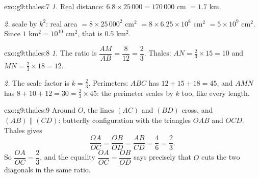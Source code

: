 \begin{solution}{exo:g9:thales:7}
\emph{1.} Real distance: $6.8 \times 25\,000 = 170\,000$ cm $=
1.7$ km.

\emph{2.}  scale by $k^2$: real area $= 8 \times 25\,000^2$
cm$^2$ $= 8 \times 6.25 \times 10^8$ cm$^2$ $= 5 \times 10^9$ cm$^2$.
Since $1$ km$^2 = 10^{10}$ cm$^2$, that is $0.5$ km$^2$.
\end{solution}

\begin{solution}{exo:g9:thales:8}
\emph{1.} The ratio is $\dfrac{AM}{AB} = \dfrac{8}{12} = \dfrac23$.
Thales: $AN = \frac23 \times 15 = 10$ and $MN = \frac23 \times 18 = 12$.

\emph{2.} The scale factor is $k = \frac23$. Perimeters: $ABC$ has
$12 + 15 + 18 = 45$, and $AMN$ has $8 + 10 + 12 = 30 = \frac23 \times
45$: the perimeter scales by $k$ too, like every length.
\end{solution}

\begin{solution}{exo:g9:thales:9}
Around $O$, the lines $(AC)$ and $(BD)$ cross, and
$(AB) \parallel (CD)$: butterfly configuration with the triangles $OAB$
and $OCD$. Thales gives
\[
\frac{OA}{OC} = \frac{OB}{OD} = \frac{AB}{CD} = \frac46 = \frac23 .
\]
So $\dfrac{OA}{OC} = \dfrac23$, and the equality
$\dfrac{OA}{OC} = \dfrac{OB}{OD}$ says precisely that $O$ cuts the two
diagonals in the same ratio.
\end{solution}

